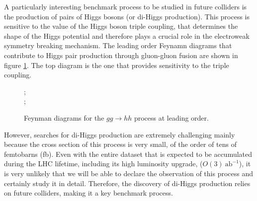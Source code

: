A particularly interesting benchmark process to be studied in future colliders is the production of pairs of Higgs bosons (or di-Higgs production). This process is sensitive to the value of the Higgs boson triple coupling, that determines the shape of the Higgs potential and therefore plays a crucial role in the electroweak symmetry breaking mechanism. The leading order Feynamn diagrams that contribute to Higgs pair production through gluon-gluon fusion are shown in figure \ref{fig:hh_diag}. The top diagram is the one that provides sensitivity to the triple coupling.

\begin{figure}[h]
	\centering
	;\\
	;
	\caption{Feynman diagrams for the $gg\rightarrow hh$ process at leading order.}
	\label{fig:hh_diag}
\end{figure}

However, searches for di-Higgs production are extremely challenging mainly because the cross section of this process is very small, of the order of tens of femtobarns (fb). Even with the entire dataset that is expected to be accumulated during the LHC lifetime, including its high luminosity upgrade, ($O(3)~\text{ab}^{-1}$), it is very unlikely that we will be able to declare the observation of this process and certainly study it in detail. Therefore, the discovery of di-Higgs production relies on future colliders, making it a key benchmark process.

